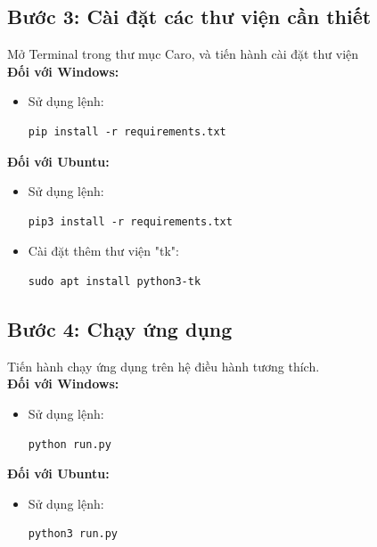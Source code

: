 \documentclass[a4paper]{article}
\newlength{\mylistingwidth}
\begin{document}
\subsection*{Bước 3: Cài đặt các thư viện cần thiết}
\begin{par}
    Mở Terminal trong thư mục Caro, và tiến hành cài đặt thư viện \\
    \textbf{Đối với Windows:}
    \begin{itemize}
        \item Sử dụng lệnh:
        \settowidth{\mylistingwidth}{\ttfamily pip install -r requirements.txt}
    \begin{lstlisting}
pip install -r requirements.txt
    \end{lstlisting}
    \end{itemize}
    \textbf{Đối với Ubuntu:}
    \begin{itemize}
        \item Sử dụng lệnh:
        \settowidth{\mylistingwidth}{\ttfamily pip3 install -r requirements.txt}
    \begin{lstlisting}
pip3 install -r requirements.txt
    \end{lstlisting}
        \item Cài đặt thêm thư viện "tk":
        \settowidth{\mylistingwidth}{\ttfamily sudo apt install python3-tk}
    \begin{lstlisting}
sudo apt install python3-tk
    \end{lstlisting}
    \end{itemize}
\end{par}

\subsection*{Bước 4: Chạy ứng dụng}
\begin{par}
    Tiến hành chạy ứng dụng trên hệ điều hành tương thích. \\
    \textbf{Đối với Windows:}
    \begin{itemize}
        \item Sử dụng lệnh:
        \settowidth{\mylistingwidth}{\ttfamily python run.py}
    \begin{lstlisting}
python run.py
    \end{lstlisting}
    \end{itemize}
    \textbf{Đối với Ubuntu:}
    \begin{itemize}
        \item Sử dụng lệnh:
        \settowidth{\mylistingwidth}{\ttfamily python3 run.py}
    \begin{lstlisting}
python3 run.py
    \end{lstlisting}
    \end{itemize}
\end{par}
\end{document}
